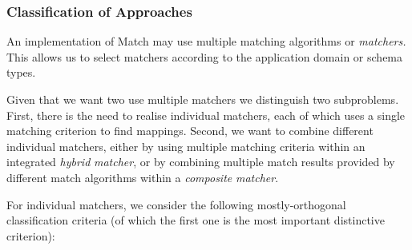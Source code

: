 \documentclass{fast_latex}
\begin{document}
\subsubsection{Classification of Approaches}
An implementation of Match may use multiple matching algorithms or
\textit{matchers. }This allows us to select matchers according to the
application domain or schema types. 

Given that we want two use multiple matchers we distinguish two
subproblems. First, there is the need to realise individual matchers,
each of which uses a single matching criterion to find mappings.
Second, we want to combine different individual matchers, either by
using multiple matching criteria within an integrated \textit{hybrid}
\textit{matcher}, or by combining multiple match results provided by
different match algorithms within a \textit{composite}
\textit{matcher}. 

For individual matchers, we consider the following mostly-orthogonal
classification criteria (of which the first one is the most important
distinctive criterion): 
\end{document}
